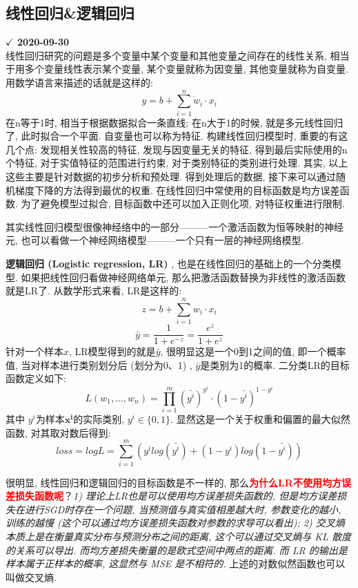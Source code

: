 \subsection{线性回归\&逻辑回归}
\textbf{$\checkmark$ 2020-09-30}\\
线性回归研究的问题是多个变量中某个变量和其他变量之间存在的线性关系, 相当于用多个变量线性表示某个变量, 某个变量就称为因变量, 其他变量就称为自变量. 用数学语言来描述的话就是这样的: 
$$
y=b + \sum_{i=1}^{n} w_i \cdot x_i 
$$
在n等于1时, 相当于根据数据拟合一条直线; 在n大于1的时候, 就是多元线性回归了, 此时拟合一个平面. 自变量也可以称为特征. 
构建线性回归模型时, 重要的有这几个点: 发现相关性较高的特征, 发现与因变量无关的特征, 得到最后实际使用的n个特征, 对于实值特征的范围进行约束, 对于类别特征的类别进行处理. 其实, 以上这些主要是针对数据的初步分析和预处理. 
得到处理后的数据, 接下来可以通过随机梯度下降的方法得到最优的权重. 在线性回归中常使用的目标函数是均方误差函数. 为了避免模型过拟合, 目标函数中还可以加入正则化项, 对特征权重进行限制. 

其实线性回归模型很像神经络中的一部分———一个激活函数为恒等映射的神经元, 也可以看做一个神经网络模型———一个只有一层的神经网络模型. 

\textbf{逻辑回归 (Logistic regression, LR) }, 也是在线性回归的基础上的一个分类模型. 如果把线性回归看做神经网络单元, 那么把激活函数替换为非线性的激活函数就是LR了. 从数学形式来看, LR是这样的: 
$$
z = b + \sum_{i=1}^{n} w_i \cdot x_i 
$$
$$
\bar{y} = \frac{1}{1 + e^{-z}} = \frac{e^z}{1 + e^z}
$$
针对一个样本$x$, LR模型得到的就是$\bar{y}$, 很明显这是一个0到1之间的值, 即一个概率值, 当对样本进行类别划分后 (划分为0、1) , $\bar{y}$是类别为1的概率. 二分类LR的目标函数定义如下: 
$$
L(w_1,...,w_n) = \prod_{i = 1}^{m} (\bar{y^i} )^{y^i} \cdot ( 1 - \bar{y^i}) ^ {1 - y^i}
$$
其中 $y^i$为样本$\boldsymbol{x^i}$的实际类别, $y^i \in \{0, 1\}$. 显然这是一个关于权重和偏置的最大似然函数, 对其取对数后得到: 
$$
loss = log L = \sum_{i=1}^{m} \left( y^i log (\bar{y^i}) + (1 - y^i) log ( 1 - \bar{y^i}) \right)
$$

很明显, 线性回归和逻辑回归的目标函数是不一样的, 那么\textcolor{red}{\textbf{为什么LR不使用均方误差损失函数呢}}？\textit{1) 理论上LR也是可以使用均方误差损失函数的, 但是均方误差损失在进行SGD时存在一个问题, 当预测值与真实值相差越大时, 参数变化的越小, 训练的越慢 ({\color{red}这个可以通过均方误差损失函数对参数的求导可以看出}); 2) 交叉熵本质上是在衡量真实分布与预测分布之间的距离, 这个可以通过交叉熵与 KL 散度的关系可以导出. 而均方差损失衡量的是欧式空间中两点的距离. 而 LR 的输出是样本属于正样本的概率, 这显然与 MSE 是不相符的.} 上述的对数似然函数也可以叫做交叉熵. 

